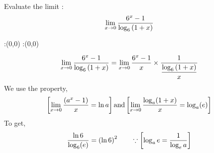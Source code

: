 


\newcommand{\ltzero}{\lim_{x \to 0}}
\newcommand{\q}{\vbone ^x - 1}
\renewcommand{\m}{\log_{\vbone} \left( 1 + x\right)}
\question Evaluate the limit : 
\begin{align}
\ltzero \dfrac{\q}{\m} \notag 
\end{align}


\watchout

\ifprintanswers
  \begin{marginfigure}
      :(0,0)
      :(0,0)
    \figdrawbegin{}
      \figdrawline [100,101]
    \figdrawend
    \figvisu{\figBoxA}{}{%
    }
    \centerline{\box\figBoxA}
  \end{marginfigure}
\fi 

\begin{solution}
\begin{align}
\ltzero \dfrac{\q}{\m} = \ltzero \dfrac{\q}{x} \times \dfrac{1}{\dfrac{\m}{x}} \\
\end{align}
We use the property,
\begin{align}
\left[ \ltzero \dfrac{(a^x - 1)}{x} = \ln a \right] \text{and} \left[ \ltzero \dfrac{\log_{a}(1+x)}{x} = \log_{a}(e) \right] \notag
\end{align}
To get,
\begin{align}
\dfrac{\ln 6}{\log_{6}(e)} = \left(\ln 6\right)^{2} \qquad \because \left[ \log_{a} e = \dfrac{1}{\log_{e} a} \right]
\end{align}
\end{solution}

